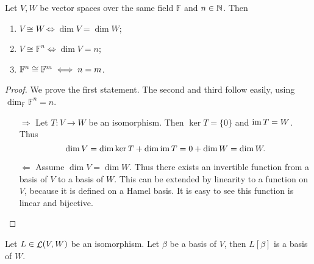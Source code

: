 \begin{proposition} \label{prop:isomorphicDimension}
Let $V,W$ be vector spaces over the same field $\mathbb{F}$ and $n\in \mathbb{N}$. Then
\begin{enumerate}
\item $V\cong W \iff \dim V = \dim W$;
\item $V \cong \mathbb{F}^n \iff \dim V = n$;
\item $\mathbb{F}^n \cong \mathbb{F}^m \iff n=m$.
\end{enumerate}
\label{isomorphicCondition}
\end{proposition}
\begin{proof}
We prove the first statement. The second and third follow easily, using $\dim_\mathbb{F} \mathbb{F}^n = n$.
\begin{itemize}
\item[$\boxed{\Rightarrow}$] Let $T:V\to W$ be an isomorphism. Then $\ker T = \{0\}$ and $\operatorname{im} T = W$. Thus
\[ \dim V = \dim \ker T + \dim \operatorname{im} T = 0 + \dim W = \dim W. \]
\item[$\boxed{\Leftarrow}$] Assume $\dim V = \dim W$. Thus there exists an invertible function from a basis of $V$ to a basis of $W$. This can be extended by linearity to a function on $V$, because it is defined on a Hamel basis. It is easy to see this function is linear and bijective.
\end{itemize}
\end{proof}

\begin{proposition} \label{prop:mappingOfBasisByIsomorphism}
Let $L\in\mathop{\mathcal{L}}(V,W)$ be an isomorphism. Let $\beta$ be a basis of $V$, then $L[\beta]$ is a basis of $W$.
\end{proposition}


